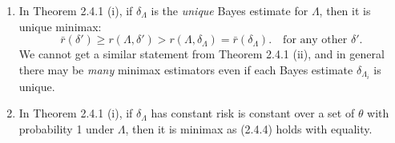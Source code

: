 \documentclass[a4paper]{article}
\begin{document}
\begin{remark}
	\quad
	\begin{enumerate}
		\item In Theorem 2.4.1 (i), if $\delta_{\Lambda}$ is the \emph{unique} Bayes estimate for $\Lambda$, then it is unique minimax:
		\begin{equation}
			\bar{r}(\delta') \geq r(\Lambda,\delta') > r(\Lambda,\delta_\Lambda) = \bar{r}(\delta_\Lambda). \quad \text{for any other } \delta'.
		\end{equation}
		We cannot get a similar statement from Theorem 2.4.1 (ii), and in general there may be \emph{many} minimax estimators even if each Bayes estimate $\delta_{\Lambda_i}$ is unique. 
		\item In Theorem 2.4.1 (i), if $\delta_{\Lambda}$ has constant risk is constant over a set of $\theta$ with probability 1 under $\Lambda$, then it is minimax as (2.4.4) holds with equality.
	\end{enumerate}
\end{remark}
\end{document}

